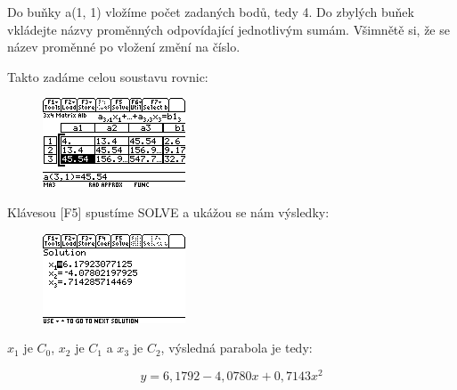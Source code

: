 \documentclass[10pt,a4paper,float]{article}
\begin{document}
Do buňky a(1, 1) vložíme počet zadaných bodů, tedy 4. Do zbylých buňek vkládejte názvy proměnných odpovídající jednotlivým sumám. Všimnětě si, že se název proměnné po vložení změní na číslo.

Takto zadáme celou soustavu rovnic:

\begin{figure}[H]
	\centering
	\includegraphics[width=.5\textwidth]{img/CTVERCE10.PNG}
\end{figure}

\pagebreak

Klávesou [F5] spustíme SOLVE a ukážou se nám výsledky:

\begin{figure}[H]
	\centering
	\includegraphics[width=.5\textwidth]{img/CTVERCE11.PNG}
\end{figure}

$x_1$ je $C_0$, $x_2$ je $C_1$ a $x_3$ je $C_2$, výsledná parabola je tedy:

\[
	y = 6,1792 - 4,0780 x + 0,7143 x^2
\]
\end{document}
